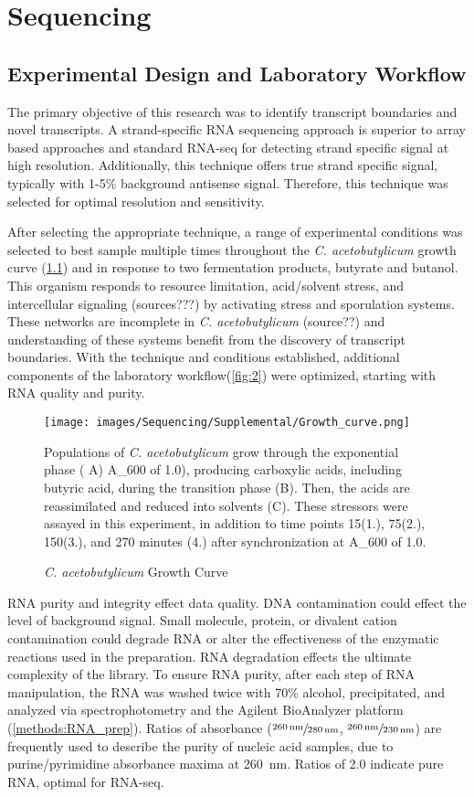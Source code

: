 
\chapter{Sequencing}
\section{Experimental Design and Laboratory Workflow}
The primary objective of this research was to identify transcript boundaries and novel transcripts. A strand-specific RNA sequencing approach is superior to array based approaches and standard RNA-seq for detecting strand specific signal at high resolution. Additionally, this technique offers true strand specific signal, typically with 1-5\% background antisense signal. Therefore, this technique was selected for optimal resolution and sensitivity.

After selecting the appropriate technique, a range of experimental conditions was selected to best sample multiple times throughout the \textit{C. acetobutylicum} growth curve (\ref{fig:1}) and in response to two fermentation products, butyrate and butanol. This organism responds to resource limitation, acid/solvent stress, and intercellular signaling (sources???) by activating stress and sporulation systems. These networks are incomplete in \textit{C. acetobutylicum} (source??) and understanding of these systems benefit from the discovery of transcript boundaries. With the technique and conditions established, additional components of the laboratory workflow(\ref{fig:2}) were optimized, starting with RNA quality and purity.

\begin{figure}
\small
\texttt{[image: images/Sequencing/Supplemental/Growth\_curve.png]}
\caption{\textit{C. acetobutylicum} Growth Curve}
\label{fig:1}
Populations of \textit{C. acetobutylicum} grow through the exponential phase ( A) A_{600} of 1.0), producing carboxylic acids, including butyric acid, during the transition phase (B). Then, the acids are reassimilated and reduced into solvents (C). These stressors were assayed in this experiment, in addition to time points 15(1.), 75(2.), 150(3.), and 270 minutes (4.) after synchronization at A_{600} of 1.0.
\end{figure}

RNA purity and integrity effect data quality. DNA contamination could effect the level of background signal. Small molecule, protein, or divalent cation contamination could degrade RNA or alter the effectiveness of the enzymatic reactions used in the preparation. RNA degradation effects the ultimate complexity of the library. To ensure RNA purity, after each step of RNA manipulation, the RNA was washed twice with 70\% alcohol, precipitated, and analyzed via spectrophotometry and the Agilent BioAnalyzer platform (\ref{methods:RNA_prep}). Ratios of absorbance ($\sfrac{\SI{260}{\nano\meter}}{\SI{280}{\nano\meter}}$, $\sfrac{\SI{260}{\nano\meter}}{\SI{230}{\nano\meter}}$) are frequently used to describe the purity of nucleic acid samples, due to purine/pyrimidine absorbance maxima at \SI{260}{\nano\meter}. Ratios of 2.0 indicate pure RNA, optimal for RNA-seq.

